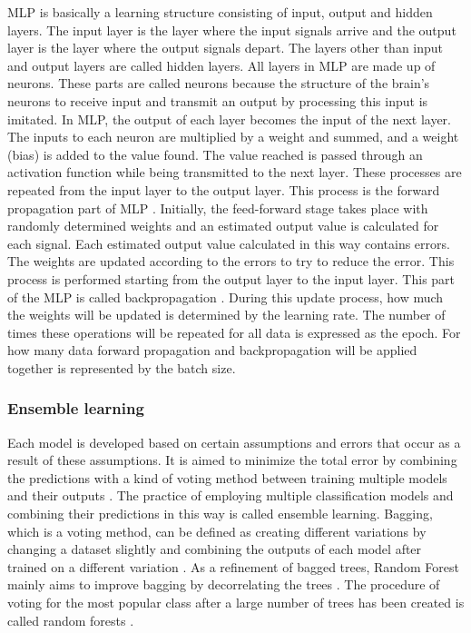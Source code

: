 MLP is basically a learning structure consisting of input, output and hidden layers. The input layer is the layer where the input signals arrive and the output layer is the layer where the output signals depart. The layers other than input and output layers are called hidden layers. All layers in MLP are made up of neurons. These parts are called neurons because the structure of the brain's neurons to receive input and transmit an output by processing this input is imitated. In MLP, the output of each layer becomes the input of the next layer. The inputs to each neuron are multiplied by a weight and summed, and a weight (bias) is added to the value found. The value reached is passed through an activation function while being transmitted to the next layer. These processes are repeated from the input layer to the output layer. This process is the forward propagation part of MLP \cite{haykin2010neural}. Initially, the feed-forward stage takes place with randomly determined weights and an estimated output value is calculated for each signal. Each estimated output value calculated in this way contains errors. The weights are updated according to the errors to try to reduce the error. This process is performed starting from the output layer to the input layer. This part of the MLP is called backpropagation \cite{haykin2010neural}. During this update process, how much the weights will be updated is determined by the learning rate. The number of times these operations will be repeated for all data is expressed as the epoch. For how many data forward propagation and backpropagation will be applied together is represented by the batch size.

\subsubsection{Ensemble learning}
Each model is developed based on certain assumptions and errors that occur as a result of these assumptions. It is aimed to minimize the total error by combining the predictions with a kind of voting method between training multiple models and their outputs \cite{alpaydin2020introduction,sewell2011ensemble}. The practice of employing multiple classification models and combining their predictions in this way is called ensemble learning.
Bagging, which is a voting method, can be defined as creating different variations by changing a dataset slightly and combining the outputs of each model after trained on a different variation \cite{alpaydin2020introduction,sewell2011ensemble}. As a refinement of bagged trees, Random Forest mainly aims to improve bagging by decorrelating the trees \cite{breiman2001random}. The procedure of voting for the most popular class after a large number of trees has been created is called random forests \cite{breiman2001random}.

